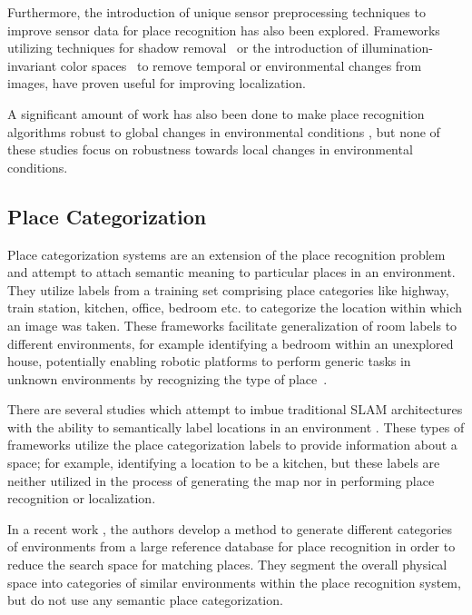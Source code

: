 \documentclass[letterpaper, 10 pt, conference]{ieeeconf}  %
\begin{document}
Furthermore, the introduction of unique sensor preprocessing techniques to improve sensor data for place recognition has also been explored. Frameworks utilizing techniques for shadow removal~\cite{corke2013dealing} or the introduction of illumination-invariant color spaces~\cite{mcmanus2014shady} to remove temporal or environmental changes from images, have proven useful for improving localization. 

A significant amount of work has also been done to make place recognition algorithms robust to global changes in environmental conditions \cite{Maddern,McManus2015}, but none of these studies focus on robustness towards local changes in environmental conditions.

\subsection{Place Categorization}

Place categorization systems are an extension of the place recognition problem and attempt to attach semantic meaning to particular places in an environment. They utilize labels from a training set comprising place categories like highway, train station, kitchen, office, bedroom etc. to categorize the location within which an image was taken. These frameworks facilitate generalization of room labels to different environments, for example identifying a bedroom within an unexplored house, potentially enabling robotic platforms to perform generic tasks in unknown environments by recognizing the type of place~\cite{wu2009visual}. 

There are several studies which attempt to imbue traditional SLAM architectures with the ability to semantically label locations in an environment \cite{sunderhauf2016place}. These types of frameworks utilize the place categorization labels to provide information about a space; for example, identifying a location to be a kitchen, but these labels are neither utilized in the process of generating the map nor in performing place recognition or localization. 

In a recent work \cite{mohan2015environment}, the authors develop a method to generate different categories of environments from a large reference database for place recognition in order to reduce the search space for matching places. They segment the overall physical space into categories of similar environments within the place recognition system, but do not use any semantic place categorization.
\end{document}
